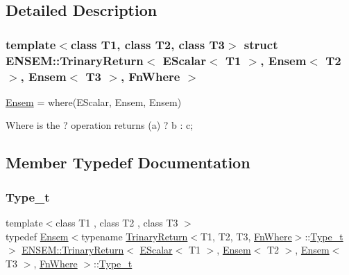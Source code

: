 \subsection{Detailed Description}
\subsubsection*{template$<$class T1, class T2, class T3$>$\newline
struct E\+N\+S\+E\+M\+::\+Trinary\+Return$<$ E\+Scalar$<$ T1 $>$, Ensem$<$ T2 $>$, Ensem$<$ T3 $>$, Fn\+Where $>$}

\mbox{\hyperlink{classENSEM_1_1Ensem}{Ensem}} = where(\+E\+Scalar, Ensem, Ensem) 

Where is the ? operation returns (a) ? b \+: c; 

\subsection{Member Typedef Documentation}
\mbox{\label{structENSEM_1_1TrinaryReturn_3_01EScalar_3_01T1_01_4_00_01Ensem_3_01T2_01_4_00_01Ensem_3_01T3_01_4_00_01FnWhere_01_4_a2b7715b3629c4779ca69a18ca98336e9}} 
\subsubsection{\texorpdfstring{Type\_t}{Type\_t}\hspace{0.1cm}{\footnotesize\ttfamily [1/3]}}
{\footnotesize\ttfamily template$<$class T1 , class T2 , class T3 $>$ \\
typedef \mbox{\hyperlink{classENSEM_1_1Ensem}{Ensem}}$<$typename \mbox{\hyperlink{structENSEM_1_1TrinaryReturn}{Trinary\+Return}}$<$T1, T2, T3, \mbox{\hyperlink{structENSEM_1_1FnWhere}{Fn\+Where}}$>$\+::\mbox{\hyperlink{structENSEM_1_1TrinaryReturn_3_01EScalar_3_01T1_01_4_00_01Ensem_3_01T2_01_4_00_01Ensem_3_01T3_01_4_00_01FnWhere_01_4_a2b7715b3629c4779ca69a18ca98336e9}{Type\+\_\+t}}$>$ \mbox{\hyperlink{structENSEM_1_1TrinaryReturn}{E\+N\+S\+E\+M\+::\+Trinary\+Return}}$<$ \mbox{\hyperlink{classENSEM_1_1EScalar}{E\+Scalar}}$<$ T1 $>$, \mbox{\hyperlink{classENSEM_1_1Ensem}{Ensem}}$<$ T2 $>$, \mbox{\hyperlink{classENSEM_1_1Ensem}{Ensem}}$<$ T3 $>$, \mbox{\hyperlink{structENSEM_1_1FnWhere}{Fn\+Where}} $>$\+::\mbox{\hyperlink{structENSEM_1_1TrinaryReturn_3_01EScalar_3_01T1_01_4_00_01Ensem_3_01T2_01_4_00_01Ensem_3_01T3_01_4_00_01FnWhere_01_4_a2b7715b3629c4779ca69a18ca98336e9}{Type\+\_\+t}}}

